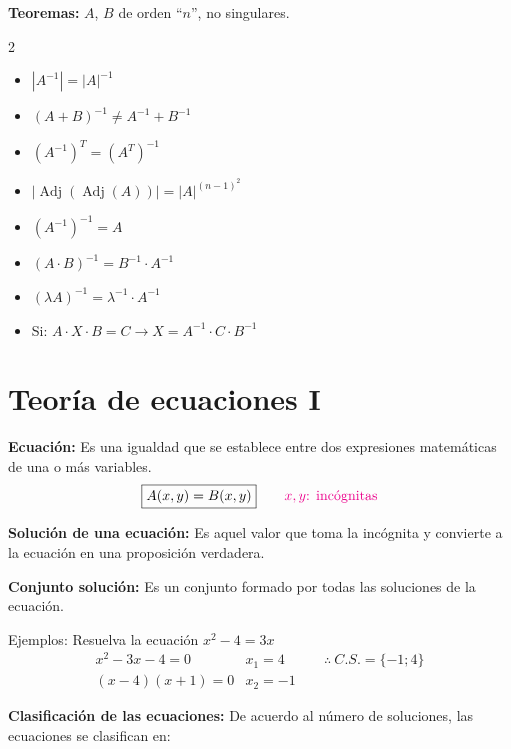 \documentclass[11pt,a4paper]{article}
\begin{document}
\textbf{Teoremas:} $A$, $B$ de orden ``$n$'', no singulares.
\begin{multicols}{2}
\begin{itemize}[label=\textcolor{naranja}{\checkmark}]
  \item $|A^{-1}| = |A|^{-1}$
  \item $(A + B)^{-1} \neq A^{-1} + B^{-1}$
  \item $(A^{-1})^T = (A^T)^{-1}$
  \item $|\operatorname{Adj}(\operatorname{Adj}(A))| = |A|^{(n-1)^2}$
  \item $(A^{-1})^{-1} = A$
  \item $(A\cdot B)^{-1} = B^{-1}\cdot A^{-1}$
  \item $(\lambda A)^{-1} = \lambda^{-1}\cdot A^{-1}$
  \item Si: $A\cdot X\cdot B = C \rightarrow X = A^{-1}\cdot C\cdot B^{-1}$
\end{itemize}
\end{multicols}

\newpage
\section{Teoría de ecuaciones I}

\textbf{Ecuación:} Es una igualdad que se establece entre dos expresiones matemáticas de
una o más variables.
\[\fbox{$A(x,y) = B(x,y)$} \qquad \textcolor{magenta}{x, y\text{: incógnitas}}\]

\textbf{Solución de una ecuación:} Es aquel valor que toma la incógnita y convierte a la
ecuación en una proposición verdadera.

\textbf{Conjunto solución:} Es un conjunto formado por todas las soluciones de la ecuación.

Ejemplos: Resuelva la ecuación $x^2 - 4 = 3x$
\[
\begin{array}{lll}
x^2 - 3x - 4 = 0 \qquad & x_1 = 4 \qquad & \therefore\ C.S. = \{-1; 4\}\\
(x-4)(x+1) = 0 & x_2 = -1 &
\end{array}
\]

\textbf{Clasificación de las ecuaciones:} De acuerdo al número de soluciones, las
ecuaciones se clasifican en:
\end{document}
